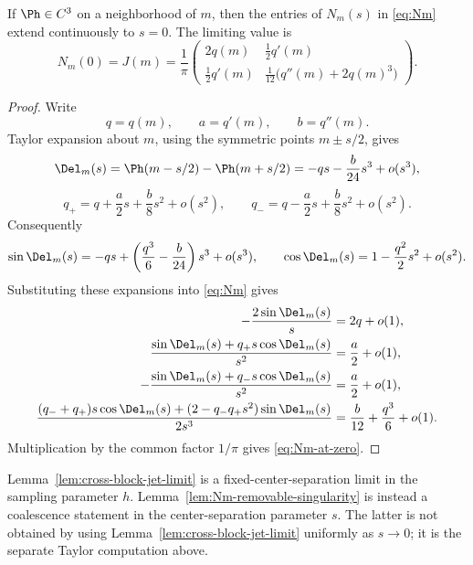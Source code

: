 \begin{lemma}
\label{lem:Nm-removable-singularity}
If \(\Ph\in C^3\) on a neighborhood of \(m\), then the entries of
\(N_m(s)\) in \eqref{eq:Nm} extend continuously to \(s=0\).  The limiting
value is
\begin{equation}
\label{eq:Nm-at-zero}
        N_m(0)=J(m)
        = \frac1\pi
        \begin{pmatrix}
        2q(m) & \tfrac12 q'(m)\\[0.8ex]
        \tfrac12 q'(m) & \tfrac1{12}\bigl(q''(m)+2q(m)^3\bigr)
        \end{pmatrix}.
\end{equation}
\end{lemma}

\begin{proof}
Write
\[
        q=q(m),\qquad a=q'(m),\qquad b=q''(m).
\]
Taylor expansion about \(m\), using the symmetric points
\(m\pm s/2\), gives
\[
        \Del_m(s)
        =\Ph(m-s/2)-\Ph(m+s/2)
        =-qs-\frac{b}{24}s^3+o(s^3),
\]
\[
        q_+=q+\frac a2s+\frac b8s^2+o(s^2),
        \qquad
        q_-=q-\frac a2s+\frac b8s^2+o(s^2).
\]
Consequently
\[
        \sin\Del_m(s)
        =-qs+\left(\frac{q^3}{6}-\frac b{24}\right)s^3+o(s^3),
        \qquad
        \cos\Del_m(s)=1-\frac{q^2}{2}s^2+o(s^2).
\]
Substituting these expansions into \eqref{eq:Nm} gives
\begin{align*}
        -\frac{2\sin\Del_m(s)}{s}
        &=2q+o(1),\\
        \frac{\sin\Del_m(s)+q_+s\cos\Del_m(s)}{s^2}
        &=\frac a2+o(1),\\
        -\frac{\sin\Del_m(s)+q_-s\cos\Del_m(s)}{s^2}
        &=\frac a2+o(1),\\
        \frac{(q_-+q_+)s\cos\Del_m(s)+(2-q_-q_+s^2)\sin\Del_m(s)}{2s^3}
        &=\frac b{12}+\frac{q^3}{6}+o(1).
\end{align*}
Multiplication by the common factor \(1/\pi\) gives
\eqref{eq:Nm-at-zero}.
\end{proof}

\begin{remark}
\label{rem:Nm-coalescence-not-cross-limit}
Lemma~\ref{lem:cross-block-jet-limit} is a fixed-center-separation limit
in the sampling parameter \(h\).  Lemma~\ref{lem:Nm-removable-singularity}
is instead a coalescence statement in the center-separation parameter
\(s\).  The latter is not obtained by using
Lemma~\ref{lem:cross-block-jet-limit} uniformly as \(s\to0\); it is the
separate Taylor computation above.
\end{remark}

